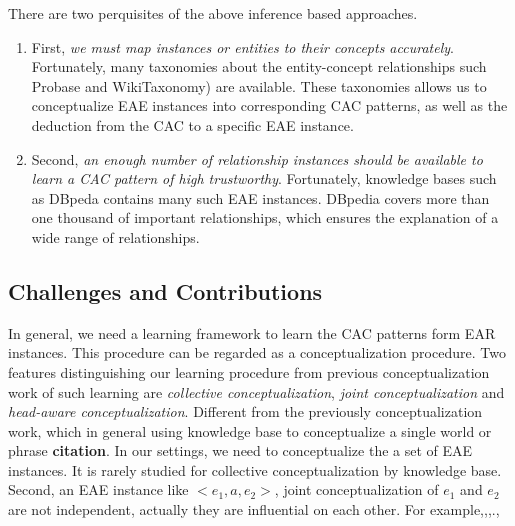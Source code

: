There are two perquisites of the above inference based approaches.
\begin{enumerate}
\item First, {\it we must map instances or entities to their concepts accurately}. Fortunately, many taxonomies about the entity-concept relationships such \ac{Probase} and \ac{WikiTaxonomy}) are available. These taxonomies allows us to conceptualize EAE instances into corresponding CAC patterns, as well as the deduction from the CAC to a specific EAE instance.
\item Second, {\it an enough number of relationship instances should be available to learn a CAC pattern of high trustworthy}. Fortunately, knowledge bases such as \ac{DBpeda} contains many such EAE instances. DBpedia covers more than one thousand of important relationships, which ensures the explanation of a wide range of relationships.  
\end{enumerate}


\subsection{Challenges and Contributions}

In general, we need a learning framework to learn the CAC patterns form EAR instances. 
This procedure can be regarded as a conceptualization procedure.
Two features distinguishing our learning procedure from previous conceptualization work of such learning are {\it collective conceptualization}, {\it joint conceptualization} and {\it head-aware conceptualization}.
Different from the previously conceptualization work, which in general using knowledge base to conceptualize a single world or phrase {\bf citation}. In our settings, we need to conceptualize the a set of EAE instances. It is rarely studied for collective conceptualization by knowledge base.
Second, an EAE instance like $<e_1, a, e_2>$, joint conceptualization of $e_1$ and $e_2$ are not independent, actually they are influential on each other. For example,,,.,
 

